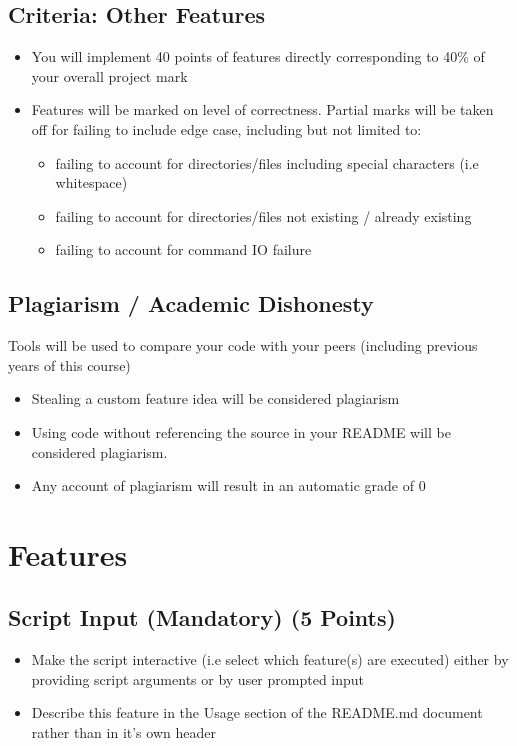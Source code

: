 \documentclass[11pt]{article}
\begin{document}
\subsection{Criteria: Other Features}
\label{sec:org2a503cd}
\begin{itemize}
\item You will implement {\color{purple}40 points} of features directly corresponding
to {\color{purple}40\%} of your overall project mark
\item Features will be marked on level of correctness. Partial marks will be
taken off for failing to include edge case, including but not limited to:
\begin{itemize}
\item failing to account for directories/files including special characters
(i.e whitespace)
\item failing to account for directories/files not existing / already existing
\item failing to account for command IO failure
\end{itemize}
\end{itemize}

\subsection{Plagiarism / Academic Dishonesty}
\label{sec:org87618e6}
Tools will be used to compare your code with your peers (including previous
years of this course) 
\begin{itemize}
\item Stealing a custom feature idea will be considered plagiarism
\item Using code without referencing the source in your README will be considered
plagiarism.
\item Any account of plagiarism will result in an automatic grade of 0
\end{itemize}

\newpage

\section{Features}
\label{sec:org69118c6}
\subsection{Script Input (\textbf{Mandatory}) (5 Points)}
\label{sec:org63cda52}
\begin{itemize}
\item Make the script interactive (i.e select which feature(s) are executed)
either by providing script arguments or by user prompted input
\item Describe this feature in the {\color{purple}Usage} section of the {\color{purple}README.md} document
rather than in it's own header
\end{itemize}
\end{document}
